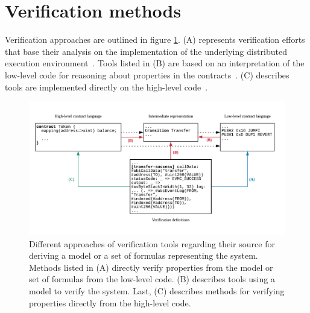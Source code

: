 \section{Verification methods}
\label{verification}

Verification approaches are outlined in figure \ref{fig:verification}. 
(A) represents verification efforts that base their analysis on the implementation of the underlying distributed execution environment~\cite{Hildenbrandt2017,Hirai2017,Bhargavan2016,Grishchenko2018}.
Tools listed in (B) are based on an interpretation of the low-level code for reasoning about properties in the contracts~\cite{Tsankov2017,Mueller2018,Luu2016,Albert2018,Grossman2017,Nikolic2018}. 
(C) describes tools are implemented directly on the high-level code~\cite{Reitwiessner2015Why3,Alt2018}. 


\begin{figure}
\includegraphics[width=\textwidth]{fig/Verification.pdf}
\caption{Different approaches of verification tools regarding their source for deriving a model or a set of formulas representing the system. Methods listed in (A) directly verify properties from the model or set of formulas from the low-level code. (B) describes tools using a model to verify the system. Last, (C) describes methods for verifying properties directly from the high-level code.}
\label{fig:verification}
\end{figure}

